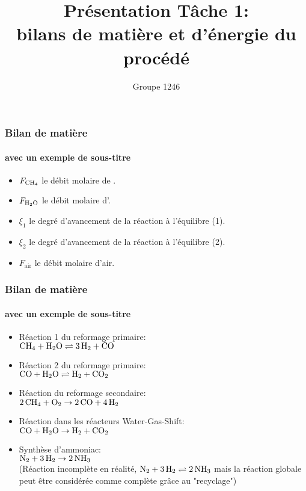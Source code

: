 \documentclass[10pt]{beamer}
\title{Présentation Tâche 1:\\ bilans de matière et d’énergie du procédé
}
\author{Groupe 1246}
\institute{École Polytechnique de Louvain}
\date{}
\begin{document}
\begin{frame}
\titlepage
\end{frame}


\begin{frame}
\frametitle{Bilan de matière}
\framesubtitle{avec un exemple de sous-titre}

\begin{itemize}
	\item $F_{}$ le débit molaire de \ce{CH4}.
	\item $F_{}$ le débit molaire d'\ce{H2O}.
	\item $\xi_1$ le degré d'avancement de la réaction à l'équilibre (1).
	\item $\xi_2$ le degré d'avancement de la réaction à l'équilibre (2).
	\item $F_{\text{air}}$ le débit molaire d'air.
\end{itemize}

\end{frame}



\begin{frame}
\frametitle{Bilan de matière}
\framesubtitle{avec un exemple de sous-titre}

\begin{itemize}
	\item Réaction 1 du reformage primaire:\\
	$\ce{CH_4} + \ce{H_{2}O} \rightleftharpoons \ce{3H_2} + \ce{CO}$
	\item Réaction 2 du reformage primaire:\\
	$\ce{CO} + \ce{H_{2}O} \rightleftharpoons \ce{H_2} + \ce{CO_2}$ 
	\item Réaction du reformage secondaire:\\
	$\ce{2CH_4} + \ce{O_2} \rightarrow \ce{2CO} + \ce{4H_2}$ 
	\item Réaction dans les réacteurs Water-Gas-Shift:\\
	$\ce{CO} + \ce{H_{2}O} \rightarrow \ce{H_2} + \ce{CO_2}$ 
	\item Synthèse d'ammoniac:\\
	$\ce{N_2} + \ce{3H_2} \rightarrow \ce{2NH_3}$\\
	(Réaction incomplète en réalité, $\ce{N_2} + \ce{3H_2} \rightleftharpoons \ce{2NH_3}$ mais la réaction globale peut être considérée comme complète grâce au "recyclage")
\end{itemize}

\end{frame}
\end{document}

